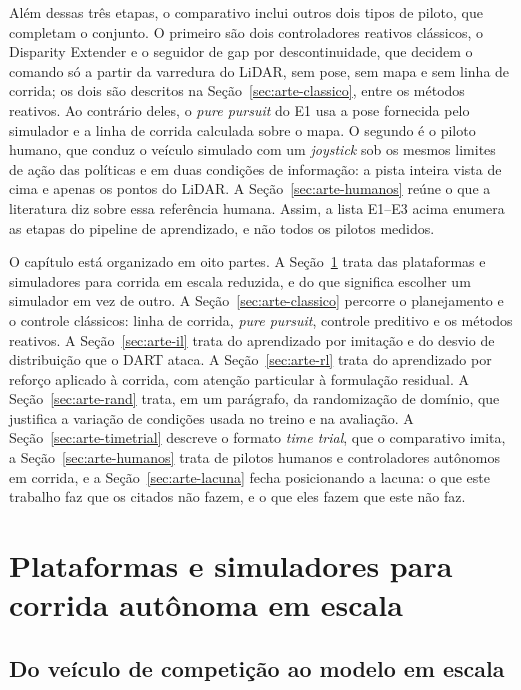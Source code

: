 Além dessas três etapas, o comparativo inclui outros dois tipos de piloto, que
completam o conjunto. O primeiro são dois controladores reativos clássicos, o
Disparity Extender e o seguidor de gap por descontinuidade, que decidem o comando
só a partir da varredura do LiDAR, sem pose, sem mapa e sem linha de corrida; os
dois são descritos na Seção~\ref{sec:arte-classico}, entre os métodos reativos.
Ao contrário deles, o \textit{pure pursuit} do E1 usa a pose fornecida pelo
simulador e a linha de corrida calculada sobre o mapa. O segundo é
o piloto humano, que conduz o veículo simulado com um \textit{joystick} sob os
mesmos limites de ação das políticas e em duas condições de informação: a pista
inteira vista de cima e apenas os pontos do LiDAR. A Seção~\ref{sec:arte-humanos}
reúne o que a literatura diz sobre essa referência humana. Assim, a lista E1--E3
acima enumera as etapas do pipeline de aprendizado, e não todos os pilotos
medidos.

O capítulo está organizado em oito partes. A Seção~\ref{sec:arte-plataformas}
trata das plataformas e simuladores para corrida em escala reduzida, e do que
significa escolher um simulador em vez de outro. A
Seção~\ref{sec:arte-classico} percorre o planejamento e o controle clássicos:
linha de corrida, \textit{pure pursuit}, controle preditivo e os métodos
reativos. A Seção~\ref{sec:arte-il} trata do aprendizado por imitação e do
desvio de distribuição que o DART ataca. A Seção~\ref{sec:arte-rl} trata do
aprendizado por reforço aplicado à corrida, com atenção particular à
formulação residual. A Seção~\ref{sec:arte-rand} trata, em um parágrafo, da
randomização de domínio, que justifica a variação de condições usada no
treino e na avaliação. A Seção~\ref{sec:arte-timetrial} descreve o formato
\textit{time trial}, que o comparativo imita, a
Seção~\ref{sec:arte-humanos} trata de pilotos humanos e controladores
autônomos em corrida, e a Seção~\ref{sec:arte-lacuna}
fecha posicionando a lacuna: o que este trabalho faz que os citados não fazem,
e o que eles fazem que este não faz.

\section{Plataformas e simuladores para corrida autônoma em escala}\label{sec:arte-plataformas}

\subsection{Do veículo de competição ao modelo em escala}

